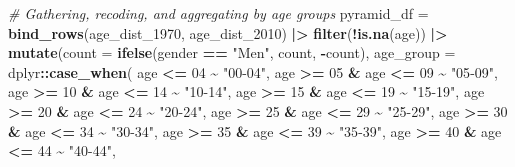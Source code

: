 \documentclass[
]{article}
\newenvironment{Shaded}{\begin{snugshade}}{\end{snugshade}}
\newcommand{\AttributeTok}[1]{\textcolor[rgb]{0.13,0.29,0.53}{#1}}
\newcommand{\CommentTok}[1]{\textcolor[rgb]{0.56,0.35,0.01}{\textit{#1}}}
\newcommand{\DecValTok}[1]{\textcolor[rgb]{0.00,0.00,0.81}{#1}}
\newcommand{\FunctionTok}[1]{\textcolor[rgb]{0.13,0.29,0.53}{\textbf{#1}}}
\newcommand{\NormalTok}[1]{#1}
\newcommand{\OtherTok}[1]{\textcolor[rgb]{0.56,0.35,0.01}{#1}}
\newcommand{\SpecialCharTok}[1]{\textcolor[rgb]{0.81,0.36,0.00}{\textbf{#1}}}
\newcommand{\StringTok}[1]{\textcolor[rgb]{0.31,0.60,0.02}{#1}}
\begin{document}
\begin{Shaded}
\begin{Highlighting}[]
\CommentTok{\# Gathering, recoding, and aggregating by age groups}
\NormalTok{pyramid\_df }\OtherTok{=} \FunctionTok{bind\_rows}\NormalTok{(age\_dist\_1970,}
\NormalTok{                       age\_dist\_2010) }\SpecialCharTok{|\textgreater{}}
        \FunctionTok{filter}\NormalTok{(}\SpecialCharTok{!}\FunctionTok{is.na}\NormalTok{(age)) }\SpecialCharTok{|\textgreater{}}
        \FunctionTok{mutate}\NormalTok{(}\AttributeTok{count =} \FunctionTok{ifelse}\NormalTok{(gender }\SpecialCharTok{==} \StringTok{"Men"}\NormalTok{, count, }\SpecialCharTok{{-}}\NormalTok{count),}
               \AttributeTok{age\_group =}\NormalTok{ dplyr}\SpecialCharTok{::}\FunctionTok{case\_when}\NormalTok{(}
\NormalTok{                       age }\SpecialCharTok{\textless{}=} \DecValTok{04}            \SpecialCharTok{\textasciitilde{}} \StringTok{"00{-}04"}\NormalTok{,}
\NormalTok{                       age }\SpecialCharTok{\textgreater{}=} \DecValTok{05} \SpecialCharTok{\&}\NormalTok{ age }\SpecialCharTok{\textless{}=} \DecValTok{09} \SpecialCharTok{\textasciitilde{}} \StringTok{"05{-}09"}\NormalTok{,}
\NormalTok{                       age }\SpecialCharTok{\textgreater{}=} \DecValTok{10} \SpecialCharTok{\&}\NormalTok{ age }\SpecialCharTok{\textless{}=} \DecValTok{14} \SpecialCharTok{\textasciitilde{}} \StringTok{"10{-}14"}\NormalTok{,}
\NormalTok{                       age }\SpecialCharTok{\textgreater{}=} \DecValTok{15} \SpecialCharTok{\&}\NormalTok{ age }\SpecialCharTok{\textless{}=} \DecValTok{19} \SpecialCharTok{\textasciitilde{}} \StringTok{"15{-}19"}\NormalTok{,}
\NormalTok{                       age }\SpecialCharTok{\textgreater{}=} \DecValTok{20} \SpecialCharTok{\&}\NormalTok{ age }\SpecialCharTok{\textless{}=} \DecValTok{24} \SpecialCharTok{\textasciitilde{}} \StringTok{"20{-}24"}\NormalTok{,}
\NormalTok{                       age }\SpecialCharTok{\textgreater{}=} \DecValTok{25} \SpecialCharTok{\&}\NormalTok{ age }\SpecialCharTok{\textless{}=} \DecValTok{29} \SpecialCharTok{\textasciitilde{}} \StringTok{"25{-}29"}\NormalTok{,}
\NormalTok{                       age }\SpecialCharTok{\textgreater{}=} \DecValTok{30} \SpecialCharTok{\&}\NormalTok{ age }\SpecialCharTok{\textless{}=} \DecValTok{34} \SpecialCharTok{\textasciitilde{}} \StringTok{"30{-}34"}\NormalTok{,}
\NormalTok{                       age }\SpecialCharTok{\textgreater{}=} \DecValTok{35} \SpecialCharTok{\&}\NormalTok{ age }\SpecialCharTok{\textless{}=} \DecValTok{39} \SpecialCharTok{\textasciitilde{}} \StringTok{"35{-}39"}\NormalTok{,}
\NormalTok{                       age }\SpecialCharTok{\textgreater{}=} \DecValTok{40} \SpecialCharTok{\&}\NormalTok{ age }\SpecialCharTok{\textless{}=} \DecValTok{44} \SpecialCharTok{\textasciitilde{}} \StringTok{"40{-}44"}\NormalTok{,}

\end{Highlighting}
\end{Shaded}
\end{document}
